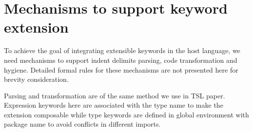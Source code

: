 \documentclass[letterpaper, notitlepage]{article}
\begin{document}
\section{Mechanisms to support keyword extension}
To achieve the goal of integrating extensible keywords in the host language, we need mechanisms to support indent delimits parsing, code transformation and hygiene. Detailed formal rules for these mechanisms are not presented here for brevity consideration.
\par
Parsing and transformation are of the same method we use in TSL paper. Expression keywords here are associated with the type name to make the extension composable while type keywords are defined in global environment with package name to avoid conflicts in different imports.
\end{document}
